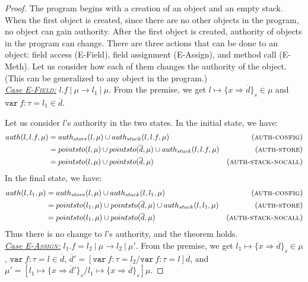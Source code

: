 \documentclass{llncs}
\newcommand{\keywadj}[1]{\mathtt{#1}}
\newcommand{\keyw}[1]{\keywadj{#1}~}
\begin{document}
\begin{proof}

The program begins with a creation of an object and an empty stack. When the first object is created, since there are no other objects in the program, no object can gain authority. After the first object is created, authority of objects in the program can change. There are three actions that can be done to an object: field access (E-Field), field assignment (E-Assign), and method call (E-Meth). Let us consider how each of them changes the authority of the object. (This can be generalized to any object in the program.)\\

\noindent\underline{\textit{Case \textsc{E-Field}:}}
$l.f~|~\mu \rightarrow l_1~|~\mu$. From the premise, we get $l \mapsto \{ x \Rightarrow \overline{d} \}_{s} \in \mu$ and $\keyw{var} f : \tau = l_1 \in \overline{d}$.

\noindent Let us consider $l$'s authority in the two states. In the initial state, we have:
\begin{align*}
auth(l, l.f, \mu) &= auth_{store}(l, \mu) \cup auth_{stack}(l, l.f, \mu) & (\textsc{auth-config})\\
&= pointsto(l, \mu) \cup pointsto(\overline{d}, \mu) \cup auth_{stack}(l, l.f, \mu) & (\textsc{auth-store})\\
&= pointsto(l, \mu) \cup pointsto(\overline{d}, \mu) & (\textsc{auth-stack-nocall})
\end{align*}
In the final state, we have:
\begin{align*}
auth(l, l_1, \mu) &= auth_{store}(l, \mu) \cup auth_{stack}(l, l_1, \mu) & (\textsc{auth-config})\\
&= pointsto(l_1, \mu) \cup pointsto(\overline{d}, \mu) \cup auth_{stack}(l, l_1, \mu) & (\textsc{auth-store})\\
&= pointsto(l_1, \mu) \cup pointsto(\overline{d}, \mu) & (\textsc{auth-stack-nocall})
\end{align*}
Thus there is no change to $l$'s authority, and the theorem holds.\\

\noindent\underline{\textit{Case \textsc{E-Assign}:}}
$l_1.f = l_2~|~\mu \longrightarrow l_2~|~\mu'$. From the premise, we get $l_1 \mapsto \{ x \Rightarrow \overline{d} \}_{s} \in \mu$, $\keyw{var} f : \tau = l \in \overline{d}$, $\overline{d}' = [\keyw{var} f : \tau = l_2/\keyw{var} f : \tau = l]\overline{d}$, and $\mu' = [l_1 \mapsto \{ x \Rightarrow \overline{d}' \}_{s}/l_1 \mapsto \{ x \Rightarrow \overline{d} \}_{s}]\mu$. 


\end{proof}
\end{document}

